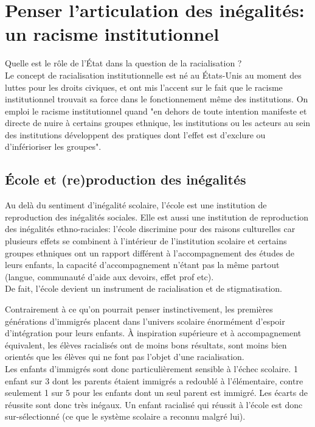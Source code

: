 \documentclass[12pt, a4paper, openany]{book}
\begin{document}
\section{Penser l'articulation des inégalités: un racisme institutionnel}

Quelle est le rôle de l'État dans la question de la racialisation ? \\
Le concept de racialisation institutionnelle est né au États-Unis au moment des luttes pour les droits civiques, et ont mis l'accent sur le fait que le racisme institutionnel trouvait sa force dans le fonctionnement même des institutions. On emploi le racisme institutionnel quand "en dehors de toute intention manifeste et directe de nuire à certains groupes ethnique, les institutions ou les acteurs au sein des institutions développent des pratiques dont l'effet est d'exclure ou d'inférioriser les groupes".

\subsection{École et (re)production des inégalités}

Au delà du sentiment d'inégalité scolaire, l'école est une institution de reproduction des inégalités sociales. Elle est aussi une institution de reproduction des inégalités ethno-raciales: l'école discrimine pour des raisons culturelles car plusieurs effets se combinent à l'intérieur de l'institution scolaire et certains groupes ethniques ont un rapport différent à l'accompagnement des études de leurs enfants, la capacité d'accompagnement n'étant pas la même partout (langue, communauté d'aide aux devoirs, effet prof etc). \\
De fait, l'école devient un instrument de racialisation et de stigmatisation.


Contrairement à ce qu'on pourrait penser instinctivement, les premières générations d'immigrés placent dans l'univers scolaire énormément d'espoir d'intégration pour leurs enfants. À inspiration supérieure et à accompagnement équivalent, les élèves racialisés ont de moins bons résultats, sont moins bien orientés que les élèves qui ne font pas l'objet d'une racialisation. \\
Les enfants d'immigrés sont donc particulièrement sensible à l'échec scolaire. 1 enfant sur 3 dont les parents étaient immigrés a redoublé à l'élémentaire, contre seulement 1 sur 5 pour les enfants dont un seul parent est immigré. Les écarts de réussite sont donc très inégaux. Un enfant racialisé qui réussit à l'école est donc sur-sélectionné (ce que le système scolaire a reconnu malgré lui).
\end{document}
